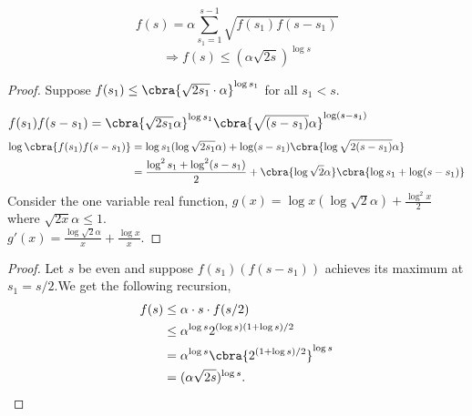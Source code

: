 \begin{claim}
    \label{claim: recursion}
    $$f(s) = \alpha \sum_{s_1 = 1}^{s-1} \sqrt{f(s_1) f(s-s_1)}$$
    $$\Rightarrow f(s) \leq (\alpha \sqrt{2s})^{\log s}$$
\end{claim}


\begin{proof}
    Suppose $f(s_1) \leq \cbra{\sqrt{2s_1} \cdot \alpha}^{\log s_1}$ for all $s_1 < s$. 

    $f(s_1) f(s-s_1) = \cbra{\sqrt{2s_1} \alpha}^{\log s_1} \cbra{\sqrt{(s -s_1)} \alpha}^{\log (s-s_1)}$\\
    
    \begin{align*}
        \log \cbra{f(s_1) f(s-s_1)} 
        &= \log s_1(\log \sqrt{2s_1}\alpha) + \log (s-s_1) \cbra{\log \sqrt{2(s-s_1)}\alpha}\\
        &= \frac{\log^2 s_1 + \log^2 (s-s_1)}{2} + \cbra{\log \sqrt{2}\alpha}                                                   
        \cbra{\log s_1 + \log (s-s_1)}
    \end{align*}
Consider the one variable real function, 
    $g(x) = \log x (\log \sqrt{2}\alpha) + \frac{\log^2 {x}}{2}$ where $\sqrt{2x}\alpha \leq 1$.\\
    
    $g'(x) = \frac{\log \sqrt{2}\alpha}{x} + \frac{\log x}{x}$.
    
    
\end{proof}



\begin{proof}
    Let $s$ be even and suppose $f(s_1)(f(s-s_1))$ achieves its maximum at $s_1 = s/2$.We get the following recursion, 
    \begin{align*}
        f(s) &\leq \alpha \cdot s \cdot f(s/2)\\
            &\leq \alpha^{\log s} 2^{(\log s)(1+ \log s)/2}\\
            &= \alpha^{\log s} \cbra{2^{(1+ \log s)/2}}^{\log s}\\
            &= (\alpha \sqrt{2s})^{\log s}. 
    \end{align*}
\end{proof}